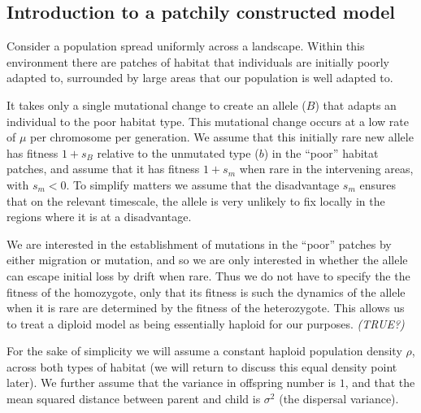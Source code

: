 \documentclass{article}
\newcommand{\gc}[1]{{\it\color{green}(#1)} }
\begin{document}
\subsection{Introduction to a patchily constructed model}
\label{ss:patchyspace}

Consider a population spread uniformly across a landscape. Within this environment there are patches of
habitat that individuals are initially poorly adapted to, surrounded by large areas that our population is well adapted to. 

It takes only a single mutational change to create an allele ($B$) that adapts an individual to the
poor habitat type. This mutational change occurs at a low rate of
$\mu$ per chromosome per generation. We assume that this initially rare new
allele has fitness $1+s_B$ relative to the unmutated type ($b$) in the ``poor'' habitat patches,
and assume that it has fitness $1+s_m$ when rare in the intervening areas, with
$s_m<0$. To simplify matters we assume that the disadvantage $s_m$ ensures that on the relevant timescale,
the allele is very unlikely to fix locally in the regions where it is at a disadvantage.

We are interested in the establishment of mutations in the ``poor'' patches by either
migration or mutation, and so we are only interested in whether the allele
can escape initial loss by drift when rare. Thus we do not have to
specify the the fitness of the homozygote, only that its
fitness is such the dynamics of the  allele when it is rare are
determined by the fitness of the heterozygote. This allows us to treat
a diploid model as being essentially haploid for our purposes. \gc{TRUE?}

For the sake of simplicity we will assume a constant haploid population density $\rho$, 
across both types of habitat (we will return to discuss this equal
density point later). We further assume that the
variance in offspring number is $1$, and that the mean squared distance between parent and child is $\sigma^2$ (the dispersal variance).
\end{document}
